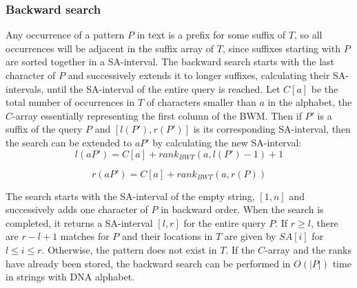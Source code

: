 \documentclass[runningheads,a4paper]{llncs}
\begin{document}
\subsubsection{Backward search}
Any occurrence of a pattern $P$ in text is a prefix for some suffix of $T$, so all occurrences will be adjacent in the suffix array of $T$, since suffixes starting with $P$ are sorted together in a SA-interval. The backward search starts with the last character of $P$ and successively extends it to longer suffixes, calculating their SA-intervals, until the SA-interval of the entire query is reached. Let $C[a]$ be the total number of occurrences in $T$ of characters smaller than $a$ in the alphabet, the $C$-array essentially representing the first column of the BWM. Then if $P'$ is a suffix of the query $P$ and $[l(P'),r(P')]$ is its corresponding SA-interval, then the search can be extended to $aP'$ by calculating the new SA-interval:
\newline
\begin{equation} 
l(aP')=C[a]+rank_{BWT}(a,l(P')-1)+1 
\end{equation} 

\begin{equation} 
r(aP')=C[a]+rank_{BWT}(a,r(P))
\end{equation}

The search starts with the SA-interval of the empty string, $[1,n]$ and successively adds one character of $P$ in backward order. When the search is completed, it returns a SA-interval $[l,r]$ for the entire query $P$. If $r \geq l$, there are $r-l+1$ matches for $P$ and their locations in $T$ are given by $SA[i]$ for $l \leq i \leq r$. Otherwise, the pattern does not exist in $T$. If the $C$-array and the ranks have already been stored, the backward search can be performed in $O(|P|)$ time in strings with DNA alphabet.
\end{document}
